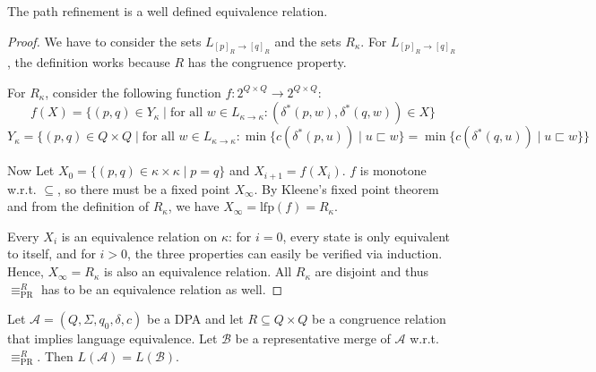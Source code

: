\begin{lem}
	The path refinement is a well defined equivalence relation.
	\label{lem:pr:pr_well_def}
\end{lem}

\begin{proof}
	We have to consider the sets $L_{[p]_R \rightarrow [q]_R}$ and the sets $R_\kappa$. For $L_{[p]_R \rightarrow [q]_R}$, the definition works because $R$ has the congruence property. 
	
	For $R_\kappa$, consider the following function $f : 2^{Q \times Q} \rightarrow 2^{Q \times Q}$: 
	$$f(X) = \{ (p, q) \in Y_\kappa \mid \text{for all } w \in L_{\kappa \rightarrow \kappa}: (\delta^*(p, w), \delta^*(q, w)) \in X \}$$
	$$ Y_\kappa = \{ (p, q) \in Q \times Q \mid \text{for all } w \in L_{\kappa \rightarrow \kappa}: \min \{ c(\delta^*(p, u)) \mid u \sqsubset w \} = \min \{ c(\delta^*(q, u)) \mid u \sqsubset w \} \} $$

	Now Let $X_0 = \{ (p, q) \in \kappa \times \kappa \mid p = q \}$ and $X_{i+1} = f(X_i)$. $f$ is monotone w.r.t. $\subseteq$, so there must be a fixed point $X_\infty$. By Kleene's fixed point theorem and from the definition of $R_\kappa$, we have $X_\infty = \text{lfp}(f) = R_\kappa$.
	
	Every $X_i$ is an equivalence relation on $\kappa$: for $i = 0$, every state is only equivalent to itself, and for $i > 0$, the three properties can easily be verified via induction. Hence, $X_\infty = R_\kappa$ is also an equivalence relation. All $R_\kappa$ are disjoint and thus $\equiv_\text{PR}^R$ has to be an equivalence relation as well.
\end{proof}

\begin{theorem}
	Let $\mathcal{A} = (Q, \Sigma, q_0, \delta, c)$ be a DPA and let $R \subseteq Q \times Q$ be a congruence relation that implies language equivalence. Let $\mathcal{B}$ be a representative merge of $\mathcal{A}$ w.r.t. $\equiv_\text{PR}^R$. Then $L(\mathcal{A}) = L(\mathcal{B})$.
\end{theorem}

